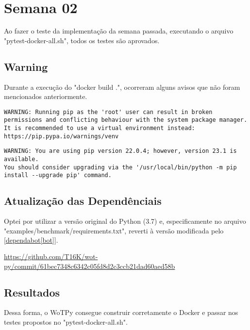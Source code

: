 
\section{Semana 02}

Ao fazer o teste da implementação da semana passada, executando o arquivo "pytest-docker-all.sh", todos os testes são aprovados.

\subsection{Warning}

Durante a execução do "docker build .", ocorreram alguns avisos que não foram mencionados anteriormente.

\begin{lstlisting}[breaklines]
WARNING: Running pip as the 'root' user can result in broken permissions and conflicting behaviour with the system package manager. It is recommended to use a virtual environment instead: https://pip.pypa.io/warnings/venv
\end{lstlisting}

\begin{lstlisting}[breaklines]
WARNING: You are using pip version 22.0.4; however, version 23.1 is available.
You should consider upgrading via the '/usr/local/bin/python -m pip install --upgrade pip' command.
\end{lstlisting}

\subsection{Atualização das Dependênciais}

Optei por utilizar a versão original do Python (3.7) e, especificamente no arquivo "examples/benchmark/requirements.txt", reverti à versão modificada pelo [\href{https://github.com/agmangas/wot-py/commit/ab14570927ccb1fcda5e7ffc415fda3c1ef2d00d}{dependabot[bot]}].

\url{https://github.com/T16K/wot-py/commit/61bec7348c6342c05fd8d2c3ccb21dad60aed58b}

\subsection{Resultados}

Dessa forma, o WoTPy consegue construir corretamente o Docker e passar nos testes propostos no "pytest-docker-all.sh".
